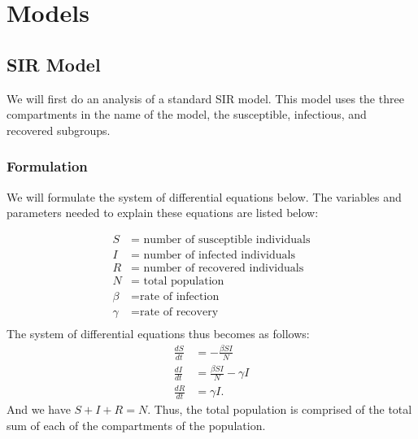 \documentclass[12pt, a4paper]{article}
\begin{document}
\section{Models}
    
    \subsection{SIR Model}
    We will first do an analysis of a standard SIR model. This model uses the three compartments in the name of the model, the susceptible, infectious, and recovered subgroups. 
    
    \subsubsection{Formulation}
    We will formulate the system of differential equations below. The variables and parameters needed to explain these equations are listed below:
    
        \begin{align*}
        S &= \text{ number of susceptible individuals}\\
        I &= \text{ number of infected individuals}\\
        R &= \text{ number of recovered individuals}\\
        N &= \text{ total population}\\
        \beta &= \text{rate of infection}\\
        \gamma &= \text{rate of recovery}\\
        \end{align*}
        The system of differential equations thus becomes as follows:
        \begin{align*}
            \frac{dS}{dt} &= -\frac{\beta SI}{N} \\
            \frac{dI}{dt} &= \frac{\beta SI}{N} - \gamma I \\
            \frac{dR}{dt} &= \gamma I.
        \end{align*}
        And we have $S + I + R = N$.
        Thus, the total population is comprised of the total sum of each of the compartments of the population.
        
\end{document}
